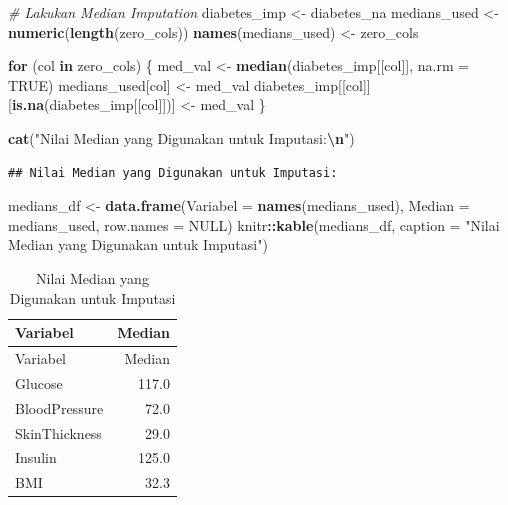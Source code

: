\documentclass[
  11pt,
]{article}
\newenvironment{Shaded}{\begin{snugshade}}{\end{snugshade}}
\newcommand{\AttributeTok}[1]{\textcolor[rgb]{0.13,0.29,0.53}{#1}}
\newcommand{\CommentTok}[1]{\textcolor[rgb]{0.56,0.35,0.01}{\textit{#1}}}
\newcommand{\ConstantTok}[1]{\textcolor[rgb]{0.56,0.35,0.01}{#1}}
\newcommand{\ControlFlowTok}[1]{\textcolor[rgb]{0.13,0.29,0.53}{\textbf{#1}}}
\newcommand{\FunctionTok}[1]{\textcolor[rgb]{0.13,0.29,0.53}{\textbf{#1}}}
\newcommand{\NormalTok}[1]{#1}
\newcommand{\OtherTok}[1]{\textcolor[rgb]{0.56,0.35,0.01}{#1}}
\newcommand{\SpecialCharTok}[1]{\textcolor[rgb]{0.81,0.36,0.00}{\textbf{#1}}}
\newcommand{\StringTok}[1]{\textcolor[rgb]{0.31,0.60,0.02}{#1}}
\begin{document}
\begin{Shaded}
\begin{Highlighting}[]
\CommentTok{\# Lakukan Median Imputation}
\NormalTok{diabetes\_imp }\OtherTok{\textless{}{-}}\NormalTok{ diabetes\_na}
\NormalTok{medians\_used }\OtherTok{\textless{}{-}} \FunctionTok{numeric}\NormalTok{(}\FunctionTok{length}\NormalTok{(zero\_cols))}
\FunctionTok{names}\NormalTok{(medians\_used) }\OtherTok{\textless{}{-}}\NormalTok{ zero\_cols}

\ControlFlowTok{for}\NormalTok{ (col }\ControlFlowTok{in}\NormalTok{ zero\_cols) \{}
\NormalTok{  med\_val }\OtherTok{\textless{}{-}} \FunctionTok{median}\NormalTok{(diabetes\_imp[[col]], }\AttributeTok{na.rm =} \ConstantTok{TRUE}\NormalTok{)}
\NormalTok{  medians\_used[col] }\OtherTok{\textless{}{-}}\NormalTok{ med\_val}
\NormalTok{  diabetes\_imp[[col]][}\FunctionTok{is.na}\NormalTok{(diabetes\_imp[[col]])] }\OtherTok{\textless{}{-}}\NormalTok{ med\_val}
\NormalTok{\}}

\FunctionTok{cat}\NormalTok{(}\StringTok{"Nilai Median yang Digunakan untuk Imputasi:}\SpecialCharTok{\textbackslash{}n}\StringTok{"}\NormalTok{)}
\end{Highlighting}
\end{Shaded}

\begin{verbatim}
## Nilai Median yang Digunakan untuk Imputasi:
\end{verbatim}

\begin{Shaded}
\begin{Highlighting}[]
\NormalTok{medians\_df }\OtherTok{\textless{}{-}} \FunctionTok{data.frame}\NormalTok{(}\AttributeTok{Variabel =} \FunctionTok{names}\NormalTok{(medians\_used), }\AttributeTok{Median =}\NormalTok{ medians\_used, }\AttributeTok{row.names =} \ConstantTok{NULL}\NormalTok{)}
\NormalTok{knitr}\SpecialCharTok{::}\FunctionTok{kable}\NormalTok{(medians\_df, }\AttributeTok{caption =} \StringTok{"Nilai Median yang Digunakan untuk Imputasi"}\NormalTok{)}
\end{Highlighting}
\end{Shaded}

\begin{longtable}[]{@{}lr@{}}
\caption{Nilai Median yang Digunakan untuk Imputasi}\tabularnewline
\toprule\noalign{}
Variabel & Median \\
\midrule\noalign{}
\endfirsthead
\toprule\noalign{}
Variabel & Median \\
\midrule\noalign{}
\endhead
\bottomrule\noalign{}
\endlastfoot
Glucose & 117.0 \\
BloodPressure & 72.0 \\
SkinThickness & 29.0 \\
Insulin & 125.0 \\
BMI & 32.3 \\
\end{longtable}
\end{document}
